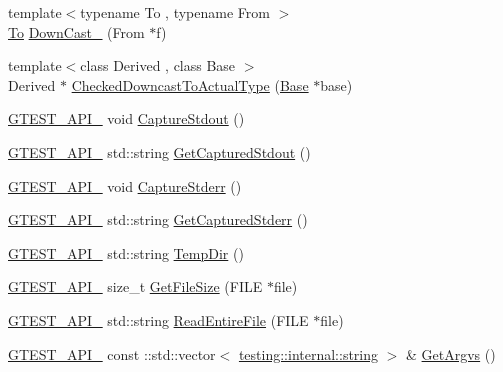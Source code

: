 \begin{DoxyCompactItemize}
\item 
{\footnotesize template$<$typename To , typename From $>$ }\\\hyperlink{classtesting_1_1internal_1_1_to}{To} \hyperlink{namespacetesting_1_1internal_a1a1a1aed3fe00908b8a45d5ab4a33665}{Down\+Cast\+\_\+} (From $\ast$f)
\item 
{\footnotesize template$<$class Derived , class Base $>$ }\\Derived $\ast$ \hyperlink{namespacetesting_1_1internal_abfe9bfb020d38aa4e0e12c001911b22b}{Checked\+Downcast\+To\+Actual\+Type} (\hyperlink{class_base}{Base} $\ast$base)
\item 
\hyperlink{gtest-port_8h_aa73be6f0ba4a7456180a94904ce17790}{G\+T\+E\+S\+T\+\_\+\+A\+P\+I\+\_\+} void \hyperlink{namespacetesting_1_1internal_acba06d4f0343dec407738ba5544af990}{Capture\+Stdout} ()
\item 
\hyperlink{gtest-port_8h_aa73be6f0ba4a7456180a94904ce17790}{G\+T\+E\+S\+T\+\_\+\+A\+P\+I\+\_\+} std\+::string \hyperlink{namespacetesting_1_1internal_aed657219a9856a8d249a3230de0c54ce}{Get\+Captured\+Stdout} ()
\item 
\hyperlink{gtest-port_8h_aa73be6f0ba4a7456180a94904ce17790}{G\+T\+E\+S\+T\+\_\+\+A\+P\+I\+\_\+} void \hyperlink{namespacetesting_1_1internal_a8ec00d458d0d442bd64af7b5f9c22dda}{Capture\+Stderr} ()
\item 
\hyperlink{gtest-port_8h_aa73be6f0ba4a7456180a94904ce17790}{G\+T\+E\+S\+T\+\_\+\+A\+P\+I\+\_\+} std\+::string \hyperlink{namespacetesting_1_1internal_a374156401da17704099d0c33fa53adfb}{Get\+Captured\+Stderr} ()
\item 
\hyperlink{gtest-port_8h_aa73be6f0ba4a7456180a94904ce17790}{G\+T\+E\+S\+T\+\_\+\+A\+P\+I\+\_\+} std\+::string \hyperlink{namespacetesting_1_1internal_a59a959f437bd7d515b5c41dcf00229c9}{Temp\+Dir} ()
\item 
\hyperlink{gtest-port_8h_aa73be6f0ba4a7456180a94904ce17790}{G\+T\+E\+S\+T\+\_\+\+A\+P\+I\+\_\+} size\+\_\+t \hyperlink{namespacetesting_1_1internal_a06ca3f65f5e85c9ce7299b9e4cd52408}{Get\+File\+Size} (F\+I\+LE $\ast$file)
\item 
\hyperlink{gtest-port_8h_aa73be6f0ba4a7456180a94904ce17790}{G\+T\+E\+S\+T\+\_\+\+A\+P\+I\+\_\+} std\+::string \hyperlink{namespacetesting_1_1internal_a2cc0be60c54a8701423fe5297e1349ee}{Read\+Entire\+File} (F\+I\+LE $\ast$file)
\item 
\hyperlink{gtest-port_8h_aa73be6f0ba4a7456180a94904ce17790}{G\+T\+E\+S\+T\+\_\+\+A\+P\+I\+\_\+} const \+::std\+::vector$<$ \hyperlink{namespacetesting_1_1internal_a8e8ff5b11e64078831112677156cb111}{testing\+::internal\+::string} $>$ \& \hyperlink{namespacetesting_1_1internal_a344160f771a3b754fa4e54b6e9846b23}{Get\+Argvs} ()

\end{DoxyCompactItemize}
